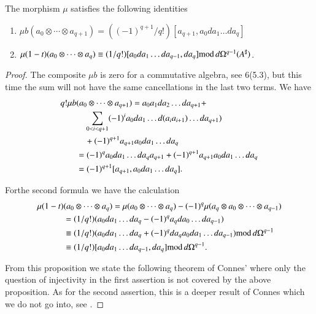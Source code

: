 \begin{proposition}\label{chap7-prop3.2}
The morphism $\mu$ satisfies the following identities
\begin{enumerate}
\renewcommand{\labelenumi}{\rm\theenumi.}
\item $\mu b(a_{0}\otimes\cdots\otimes
  a_{q+1})=((-1)^{q+1}/q!)[a_{q+1},a_{0}da_{1}\ldots da_{q}]$

\item $\mu(1-t)(a_{0}\otimes\cdots\otimes a_{q})\equiv
  (1/q!)[a_{0}da_{1}\ldots da_{q-1},da_{q}]{\rm mod\,}
  d\Omega^{q-1}(A^{\sharp})$. 
\end{enumerate}
\end{proposition}

\begin{proof}
The composite $\mu b$ is zero for a commutative algebra, see 6(5.3),
but this time the sum will not have the same cancellations in the last
two terms. We have
\begin{align*}
q!\mu b & (a_{0}\otimes\cdots\otimes a_{q+1}) = a_{0}a_{1}da_{2}\ldots
da_{q+1}+\\
&\quad \sum_{0<i<q+1}(-1)^{i}a_{0}da_{1}\ldots d(a_{i}a_{i+1})\ldots
da_{q+1})\\
&\quad +(-1)^{q+1}a_{q+1}a_{0}da_{1}\ldots da_{q}\\
&= (-1)^{q}a_{0}da_{1}\ldots
da_{q}a_{q+1}+(-1)^{q+1}a_{q+1}a_{0}da_{1}\ldots da_{q}\\
&= (-1)^{q+1}[a_{q+1},a_{0}da_{1}\ldots da_{q}].
\end{align*}

For\pageoriginale the second formula we have the calculation
\begin{align*}
\mu(1-t)& (a_{0}\otimes \cdots\otimes a_{q}) =
\mu(a_{0}\otimes\cdots\otimes a_{q})-(-1)^{q}\mu(a_{q}\otimes
a_{0}\otimes\cdots\otimes a_{q-1})\\
&= (1/q!)(a_{0}da_{1}\ldots da_{q}-(-1)^{q}a_{q}da_{0}\ldots
da_{q-1})\\
&\equiv (1/q!)(a_{0}da_{1}\ldots
da_{q}+(-1)^{q}da_{q}a_{0}da_{1}\ldots da_{q-1}){\rm
  mod\,}d\Omega^{q-1}\\ 
&\equiv (1/q!)[a_{0}da_{1}\ldots da_{q-1},da_{q}]{\rm
  mod\,}d\Omega^{q-1}. 
\end{align*}

From this proposition we state the following theorem of Connes' where
only the question of injectivity in the first assertion is not covered
by the above proposition. As for the second assertion, this is a
deeper result of Connes which we do not go into, see \cite{Connes1985}.
\end{proof}

